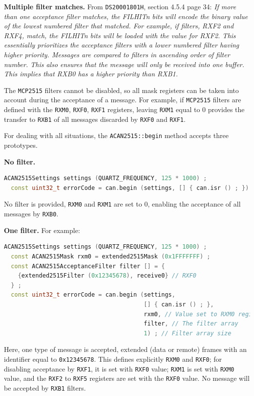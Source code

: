 \documentclass[10pt, a4paper, obeyspaces, openany]{extarticle}
\begin{document}
{\bf Multiple filter matches.} From \texttt{DS20001801H}, section 4.5.4 page 34: \emph{If more than one acceptance filter matches, the FILHITn bits will encode the binary value of the lowest numbered filter that matched. For example, if filters, RXF2 and RXF4, match, the FILHITn bits will be loaded with the value for RXF2. This essentially prioritizes the acceptance filters with a lower numbered filter having higher priority. Messages are compared to filters in ascending order of filter number. This also ensures that the message will only be received into one buffer. This implies that RXB0 has a higher priority than RXB1.}

The \texttt{MCP2515} filters cannot be disabled, so all mask registers can be taken into account during the acceptance of a message. For example, if \texttt{MCP2515} filters are defined with the \texttt{RXM0}, \texttt{RXF0}, \texttt{RXF1} registers, leaving \texttt{RXM1} equal to $0$ provides the transfer to \texttt{RXB1} of all messages discarded by \texttt{RXF0} and \texttt{RXF1}.

For dealing with all situations, the \texttt{ACAN2515::begin} method accepts three prototypes.

{\bf No filter.}
{ \small\begin{lstlisting}[language=c++]
  ACAN2515Settings settings (QUARTZ_FREQUENCY, 125 * 1000) ;
  const uint32_t errorCode = can.begin (settings, [] { can.isr () ; }) ;
\end{lstlisting}}
No filter is provided, \texttt{RXM0} and \texttt{RXM1} are set to $0$, enabling the acceptance of all messages by \texttt{RXB0}.



{\bf One filter.} For example:
{ \small\begin{lstlisting}[language=c++]
  ACAN2515Settings settings (QUARTZ_FREQUENCY, 125 * 1000) ;
  const ACAN2515Mask rxm0 = extended2515Mask (0x1FFFFFFF) ;
  const ACAN2515AcceptanceFilter filter [] = {
    {extended2515Filter (0x12345678), receive0} // RXF0
  } ;
  const uint32_t errorCode = can.begin (settings,
                                        [] { can.isr () ; },
                                        rxm0, // Value set to RXM0 register
                                        filter, // The filter array
                                        1) ; // Filter array size
\end{lstlisting}}

Here, one type of message is accepted, extended (data or remote) frames with an identifier equal to \texttt{0x12345678}. This defines explicitly \texttt{RXM0} and \texttt{RXF0}; for disabling acceptance by \texttt{RXF1}, it is set with \texttt{RXF0} value; \texttt{RXM1} is set with \texttt{RXM0} value, and the \texttt{RXF2} to \texttt{RXF5} registers are set with the \texttt{RXF0} value. No message will be accepted by \texttt{RXB1} filters.
\end{document}
